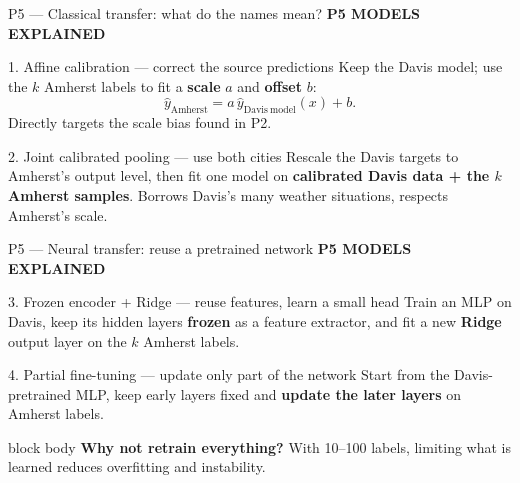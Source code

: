 \documentclass[aspectratio=169,11pt]{beamer}
\newcommand{\sectiontag}[1]{{\footnotesize\usebeamercolor[fg]{structure}\textbf{#1}}\par\vspace{0.10cm}}
\begin{document}
\begin{frame}{P5 — Classical transfer: what do the names mean?}
\sectiontag{P5 \quad MODELS EXPLAINED}
\begin{block}{1. Affine calibration — correct the source predictions}
\small Keep the Davis model; use the $k$ Amherst labels to fit a \textbf{scale} $a$ and \textbf{offset} $b$:
\[
\hat y_{\mathrm{Amherst}} = a\,\hat y_{\mathrm{Davis\ model}}(x) + b.
\]
Directly targets the scale bias found in P2.
\end{block}
\vspace{0.12cm}
\begin{block}{2. Joint calibrated pooling — use both cities}
\small Rescale the Davis targets to Amherst's output level, then fit one model on \textbf{calibrated Davis data + the $k$ Amherst samples}. Borrows Davis's many weather situations, respects Amherst's scale.
\end{block}
\end{frame}

\begin{frame}{P5 — Neural transfer: reuse a pretrained network}
\sectiontag{P5 \quad MODELS EXPLAINED}
\begin{block}{3. Frozen encoder + Ridge — reuse features, learn a small head}
\small Train an MLP on Davis, keep its hidden layers \textbf{frozen} as a feature extractor, and fit a new \textbf{Ridge} output layer on the $k$ Amherst labels.
\end{block}
\vspace{0.14cm}
\begin{block}{4. Partial fine-tuning — update only part of the network}
\small Start from the Davis-pretrained MLP, keep early layers fixed and \textbf{update the later layers} on Amherst labels.
\end{block}
\vspace{0.15cm}
\begin{beamercolorbox}[sep=0.13cm,wd=\linewidth]{block body}
\small \textbf{Why not retrain everything?} With 10--100 labels, limiting what is learned reduces overfitting and instability.
\end{beamercolorbox}
\end{frame}
\end{document}
